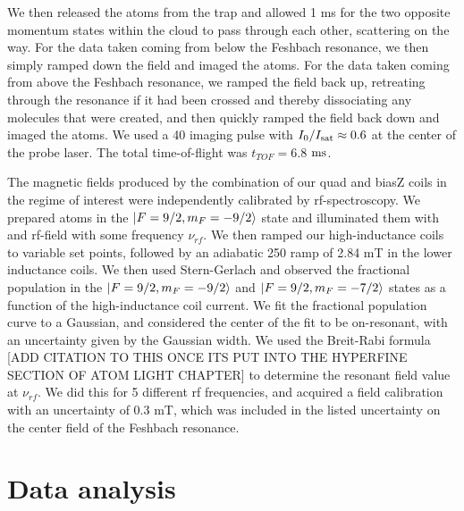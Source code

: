 We then released the atoms from the trap and allowed 1 ms for the two opposite momentum states within the cloud to pass through each other, scattering on the way. For the data taken coming from below the Feshbach resonance, we then simply ramped down the field and imaged the atoms. For the data taken coming from above the Feshbach resonance, we ramped the field back up, retreating through the resonance if it had been crossed and thereby dissociating any molecules that were created, and then quickly ramped the field back down and imaged the atoms. We used a 40 \us{} imaging pulse with $I_0/I_{\rm{sat}}\approx 0.6$ at the center of the probe laser. The total time-of-flight was $t_{TOF}=6.8$ $\rm{ms}$.

The magnetic fields produced by the combination of our quad and biasZ coils in the regime of interest were independently calibrated by rf-spectroscopy. We prepared \K{} atoms in the $\mathinner{|{F=9/2, m_F=-9/2}\rangle}$ state and illuminated them with and rf-field with some frequency $\nu_{rf}$. We then ramped our high-inductance coils to variable set points, followed by an adiabatic 250\us{} ramp of 2.84 mT in the lower inductance coils. We then used Stern-Gerlach and observed the fractional population in the $\mathinner{|{F=9/2, m_F=-9/2}\rangle}$  and $\mathinner{|{F=9/2, m_F=-7/2}\rangle}$ states as a function of the high-inductance coil current. We fit the fractional population curve to a Gaussian, and considered the center of the fit to be on-resonant, with an uncertainty given by the Gaussian width. We used the Breit-Rabi formula [ADD CITATION TO  THIS ONCE ITS PUT INTO THE HYPERFINE SECTION OF ATOM LIGHT CHAPTER] to determine the resonant field value at $\nu_{rf}$. We did this for 5 different rf frequencies, and acquired a field calibration with an uncertainty of 0.3 mT, which was included in the listed uncertainty on the center field of the Feshbach resonance.


\section{Data analysis}

